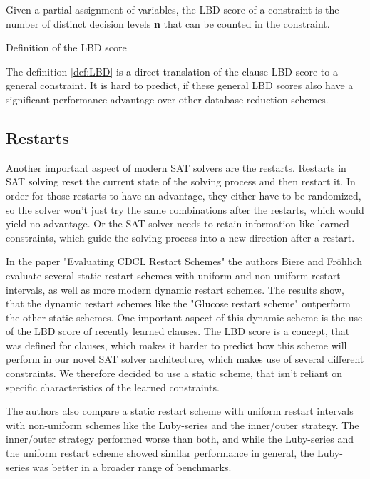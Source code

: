 \begin{definition}[!htb]
\begin{leftbar}
Given a partial assignment of variables, the LBD score of a constraint is the number of distinct decision levels \textbf{n} that can be counted in the constraint.
\end{leftbar}
\caption{Definition of the LBD score}
\label{def:LBD}
\end{definition}

The definition \ref{def:LBD} is a direct translation of the clause LBD score to a general constraint. It is hard to predict, if these general LBD scores also have a significant performance advantage over other database reduction schemes.

\subsection{Restarts}

Another important aspect of modern SAT solvers are the restarts. Restarts in SAT solving reset the current state of the solving process and then restart it. In order for those restarts to have an advantage, they either have to be randomized, so the solver won't just try the same combinations after the restarts, which would yield no advantage. Or the SAT solver needs to retain information like learned constraints, which guide the solving process into a new direction after a restart.
\cite{biere2009handbook}

In the paper "Evaluating CDCL Restart Schemes" \cite{biere2015evaluatingRestarts} the authors Biere and Fröhlich evaluate several static restart schemes with uniform and non-uniform restart intervals, as well as more modern dynamic restart schemes. The results show, that the dynamic restart schemes like the "Glucose restart scheme" \cite{biere2015evaluatingRestarts} outperform the other static schemes. One important aspect of this dynamic scheme is the use of the LBD score of recently learned clauses. The LBD score is a concept, that was defined for clauses, which makes it harder to predict how this scheme will perform in our novel SAT solver architecture, which makes use of several different constraints. We therefore decided to use a static scheme, that isn't reliant on specific characteristics of the learned constraints.

The authors also compare a static restart scheme with uniform restart intervals with non-uniform schemes like the Luby-series and the inner/outer strategy. The inner/outer strategy performed worse than both, and while the Luby-series and the uniform restart scheme showed similar performance in general, the Luby-series was better in a broader range of benchmarks. \cite{biere2015evaluatingRestarts}

